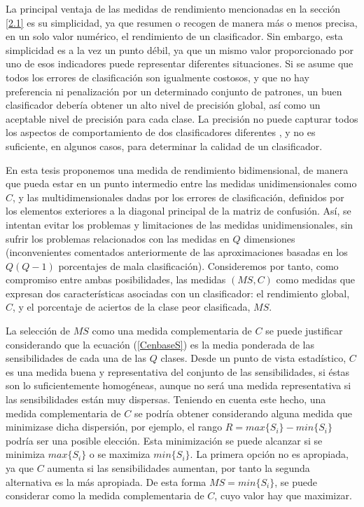 La principal ventaja de las medidas de rendimiento mencionadas en la sección \ref{2.1}
es su simplicidad, ya que resumen o recogen de manera más o menos precisa, en un solo
valor numérico, el rendimiento de un clasificador. Sin embargo, esta simplicidad es a la
vez un punto débil, ya que un mismo valor proporcionado por uno de esos indicadores puede
representar diferentes situaciones. Si se asume que todos los errores de clasificación son
igualmente costosos, y que no hay preferencia ni penalización por un determinado conjunto
de patrones, un buen clasificador debería obtener un alto nivel de precisión global, así
como un aceptable nivel de precisión para cada clase. La precisión no puede capturar todos
los aspectos de
comportamiento	de dos clasificadores diferentes \cite{Provost1997,Provost1998}, y no es
suficiente, en algunos casos, para	determinar la calidad de un clasificador.

En esta tesis proponemos una medida de rendimiento bidimensional, de manera que pueda estar
en un punto intermedio entre las medidas unidimensionales como $C$, y las
multidimensionales dadas por los errores de clasificación, definidos por los elementos
exteriores a la diagonal principal de la matriz de confusión. Así, se intentan evitar los
problemas y limitaciones de las medidas unidimensionales, sin sufrir los
problemas relacionados con las medidas en $Q$ dimensiones (inconvenientes comentados
anteriormente de las aproximaciones
basadas en los $Q(Q-1)$ porcentajes de mala clasificación). Consideremos por tanto, como
compromiso entre ambas posibilidades, las medidas $(MS,C)$ como medidas que expresan dos
características asociadas con un clasificador: el rendimiento global, $C$, y el porcentaje
de aciertos de la clase peor clasificada, $MS$.

La selección de $MS$ como una medida complementaria de $C$ se puede justificar
considerando que la ecuación (\ref{CenbaseS}) es la media ponderada de las
sensibilidades de cada una de las $Q$ clases. Desde un punto de vista estadístico, $C$ es
una medida buena y representativa del conjunto de las sensibilidades, si éstas son lo
suficientemente homogéneas, aunque no será una medida representativa si las sensibilidades
están muy dispersas. Teniendo en cuenta este hecho, una medida complementaria de $C$ se
podría obtener considerando alguna medida que minimizase dicha dispersión, por ejemplo, el
rango $R=max\{S_{i}\}-min\{S_{i}\}$ podría ser una posible elección. Esta minimización
se puede	alcanzar si se minimiza $max\{S_{i}\}$ o se maximiza $min\{S_{i}\}$. La primera
opción no es apropiada, ya que $C$ aumenta si las sensibilidades aumentan,
por tanto la segunda alternativa es la más apropiada. De esta forma $MS=min\{S_{i}\}$, se
puede	considerar como la medida complementaria de $C$, cuyo valor hay que maximizar.

